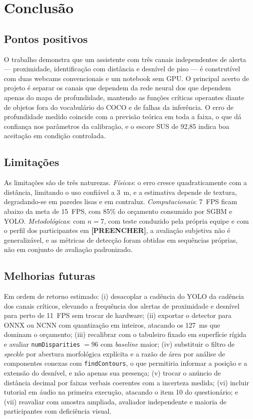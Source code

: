 \documentclass[12pt]{article}
\begin{document}
\section{Conclusão}

\subsection{Pontos positivos}

O trabalho demonstra que um assistente com três canais independentes de
alerta --- proximidade, identificação com distância e desnível de piso --- é
construtível com duas webcams convencionais e um notebook sem GPU. O principal
acerto de projeto é separar os canais que dependem da rede neural dos que
dependem apenas do mapa de profundidade, mantendo as funções críticas
operantes diante de objetos fora do vocabulário do COCO e de falhas da
inferência. O erro de profundidade medido coincide com a previsão teórica em
toda a faixa, o que dá confiança nos parâmetros da calibração, e o escore SUS
de 92,85 indica boa aceitação em condição controlada.

\subsection{Limitações}

As limitações são de três naturezas. \emph{Físicas}: o erro cresce
quadraticamente com a distância, limitando o uso confiável a 3~m, e a
estimativa depende de textura, degradando-se em paredes lisas e em contraluz.
\emph{Computacionais}: 7~FPS ficam abaixo da meta de 15~FPS, com 85\% do
orçamento consumido por SGBM e YOLO. \emph{Metodológicas}: com $n = 7$, com
teste conduzido pela própria equipe e com o perfil dos participantes em
\textbf{[PREENCHER]}, a avaliação subjetiva não é generalizável, e as
métricas de detecção foram obtidas em sequências próprias, não em conjunto de
avaliação padronizado.

\subsection{Melhorias futuras}

Em ordem de retorno estimado: (i) desacoplar a cadência do YOLO da cadência
dos canais críticos, elevando a frequência dos alertas de proximidade e
desnível para perto de 11~FPS sem trocar de hardware; (ii) exportar o detector
para ONNX ou NCNN com quantização em inteiros, atacando os 127~ms que dominam
o orçamento; (iii) recalibrar com o tabuleiro fixado em superfície rígida e
avaliar \texttt{numDisparities} $= 96$ com \textit{baseline} maior;
(iv) substituir o filtro de \textit{speckle} por abertura morfológica
explícita e a razão de área por análise de componentes conexas com
\texttt{findContours}, o que permitiria informar a posição e a extensão do
desnível, e não apenas sua presença; (v) trocar o anúncio de distância
decimal por faixas verbais coerentes com a incerteza medida; (vi) incluir
tutorial em áudio na primeira execução, atacando o item 10 do questionário; e
(vii) reavaliar com amostra ampliada, avaliador independente e maioria de
participantes com deficiência visual.
\end{document}
